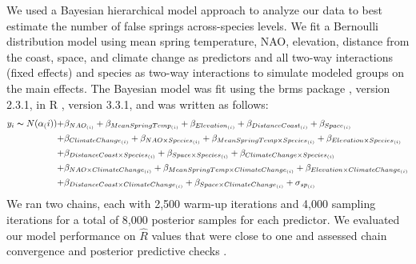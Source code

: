 \documentclass{article}\usepackage[]{graphicx}\usepackage[]{color}
\begin{document}
We used a Bayesian hierarchical model approach to analyze our data to best estimate the number of false springs across-species levels. We fit a Bernoulli distribution model using mean spring temperature, NAO, elevation, distance from the coast, space, and climate change as predictors and all two-way interactions (fixed effects) and species as two-way interactions to simulate modeled groups on the main effects. The Bayesian model was fit using the brms package \citep{brms}, version 2.3.1,  in R \citep{R}, version 3.3.1, and was written as follows: 
\begin{align*} \label{eq:1} 
y_i \thicksim N(\alpha_(i)) +&  \beta_{NAO_{(i)}} + \beta_{MeanSpringTemp_{(i)}} + \beta_{Elevation_{(i)}} + \beta_{DistanceCoast_{(i)}} + \beta_{Space_{(i)}} \\ +& \beta_{ClimateChange_{(i)}}
+ \beta_{NAO \times Species_{(i)}} + \beta_{MeanSpringTemp \times Species_{(i)}} + \beta_{Elevation \times Species_{(i)}} \\ +& \beta_{DistanceCoast \times Species_{(i)}} + \beta_{Space \times Species_{(i)}} + \beta_{ClimateChange \times Species_{(i)}} \\
+& \beta_{NAO \times ClimateChange_{(i)}} + \beta_{MeanSpringTemp \times ClimateChange_{(i)}} 
+ \beta_{Elevation \times ClimateChange_{(i)}} \\ +& \beta_{DistanceCoast \times ClimateChange_{(i)}} + \beta_{Space \times ClimateChange_{(i)}} + \sigma_{sp_{(i)}} 
\end{align*}
We ran two chains, each with 2,500 warm-up iterations and 4,000 sampling iterations for a total of 8,000 posterior samples for each predictor. We evaluated our model performance on $\hat{R}$ values that were close to one and assessed chain convergence and posterior predictive checks \citep{Gelman2006}.
\end{document}
